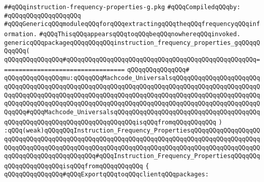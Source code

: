 \label{src/lib/compiler/back/low/code/instruction-frequency-properties-g.pkg}
\verb|##qQQqinstruction-frequency-properties-g.pkg|\newline
\newline
\verb|#qQQqCompiledqQQqby:|\newline
\verb|#qQQqqQQqqQQqqQQqqQQq|\newline
\newline
\newline
\verb|#qQQqGenericqQQqmoduleqQQqforqQQqextractingqQQqtheqQQqfrequencyqQQqinformation.|\newline
\newline
\verb|#qQQqThisqQQqappearsqQQqtoqQQqbeqQQqnowhereqQQqinvoked.|\newline
\newline
\verb|genericqQQqpackageqQQqqQQqqQQqinstruction_frequency_properties_gqQQqqQQqqQQq(|\newline
\verb|qQQqqQQqqQQqqQQq#qQQqqQQqqQQqqQQqqQQqqQQqqQQqqQQqqQQqqQQqqQQqqQQqqQQq==================================|\newline
\verb|qQQqqQQqqQQqqQQq#|\newline
\verb|qQQqqQQqqQQqqQQqmu:qQQqqQQqMachcode_UniversalsqQQqqQQqqQQqqQQqqQQqqQQqqQQqqQQqqQQqqQQqqQQqqQQqqQQqqQQqqQQqqQQqqQQqqQQqqQQqqQQqqQQqqQQqqQQqqQQqqQQqqQQqqQQqqQQqqQQqqQQqqQQqqQQqqQQqqQQqqQQqqQQqqQQqqQQqqQQqqQQqqQQqqQQqqQQqqQQqqQQqqQQqqQQqqQQqqQQqqQQqqQQqqQQqqQQqqQQqqQQqqQQqqQQqqQQqqQQqqQQq#qQQqMachcode_UniversalsqQQqqQQqqQQqqQQqqQQqqQQqqQQqqQQqqQQqqQQqqQQqqQQqqQQqqQQqqQQqqQQqqQQqqQQqqQQqisqQQqfromqQQqqQQqqQQq|\newline
\verb|)|\newline
\verb|:qQQq(weak)qQQqqQQqInstruction_Frequency_PropertiesqQQqqQQqqQQqqQQqqQQqqQQqqQQqqQQqqQQqqQQqqQQqqQQqqQQqqQQqqQQqqQQqqQQqqQQqqQQqqQQqqQQqqQQqqQQqqQQqqQQqqQQqqQQqqQQqqQQqqQQqqQQqqQQqqQQqqQQqqQQqqQQqqQQqqQQqqQQqqQQqqQQqqQQqqQQqqQQqqQQqqQQq#qQQqInstruction_Frequency_PropertiesqQQqqQQqqQQqqQQqqQQqqQQqisqQQqfromqQQqqQQqqQQq|\newline
\verb|{|\newline
\verb|qQQqqQQqqQQqqQQq#qQQqExportqQQqtoqQQqclientqQQqpackages:|\newline

